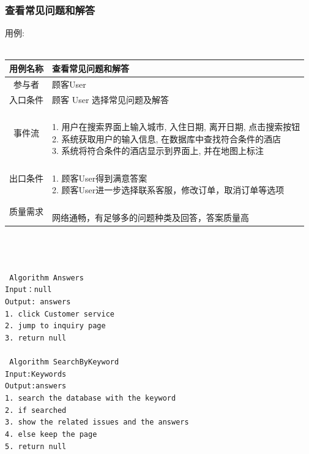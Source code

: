 \documentclass[11pt]{article}
\begin{document}
		\subsubsection{查看常见问题和解答}
			用例: \\ \\
			\begin{tabular}{c|l}
			\hline
			用例名称 & 查看常见问题和解答 \\ \hline
			参与者 & 顾客User  \\ \hline
			入口条件 & 顾客 User 选择常见问题及解答 \\ \hline
			事件流 & 	\parbox{33em}{\ \\
						1. 用户在搜索界面上输入城市, 入住日期,  离开日期, 点击搜索按钮 \\
						2. 系统获取用户的输入信息, 在数据库中查找符合条件的酒店 \\
						3. 系统将符合条件的酒店显示到界面上, 并在地图上标注  \\
						} \\ \hline
			出口条件 & \parbox{33em}{\ \\
						1. 顾客User得到满意答案 \\
						2.  	顾客User进一步选择联系客服，修改订单，取消订单等选项 \\
						} \\ \hline
			质量需求 & \parbox{33em}{\ \\
						网络通畅，有足够多的问题种类及回答，答案质量高 \\
						} \\ \hline
			\end{tabular} \\ \\ \\
			\texttt{
			Algorithm Answers \\
				Input：null \\
				Output: answers \\
				1.	click Customer service \\
				2.	jump to inquiry page \\
				3.	return null \\
			} \\
			\texttt{
			Algorithm SearchByKeyword \\
			Input:Keywords \\
			Output:answers \\
			1.	search the database with the keyword \\
			2.	if searched \\
			3.	show the related issues and the answers \\
			4.	else keep the page \\
			5.	return null \\
			} \\
\end{document}
